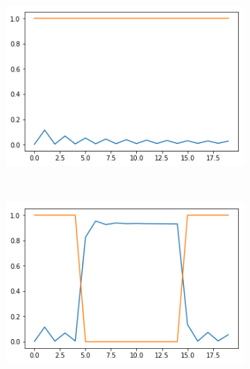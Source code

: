 \documentclass[12pt, letterpaper]{article}
\begin{document}
\begin{figure}[h]
    \centering
    \begin{subfigure}[b]{0.3\textwidth}
        \includegraphics[width=\textwidth]{fo_f1}
        \label{fig:gull}
    \end{subfigure}
    ~ %
    \begin{subfigure}[b]{0.3\textwidth}
        \includegraphics[width=\textwidth]{fo_f2}
        \label{fig:tiger}
    \end{subfigure}
    ~ %
    \begin{subfigure}[b]{0.3\textwidth}

\end{subfigure}
\end{figure}
\end{document}
